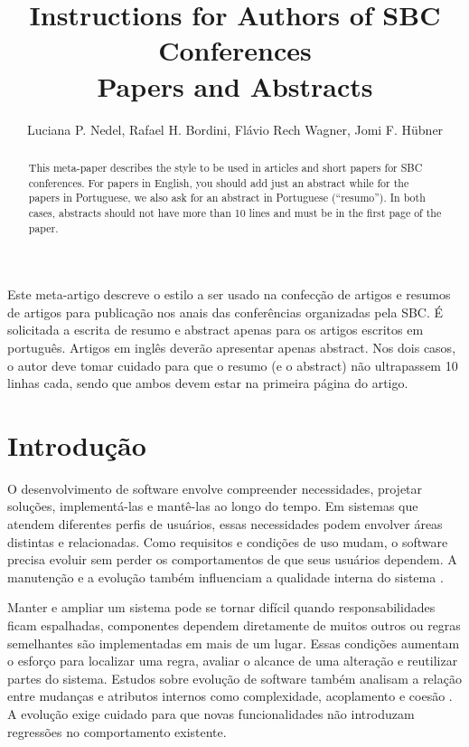 \documentclass[12pt]{article}
\title{Instructions for Authors of SBC Conferences\\ Papers and Abstracts}
\author{Luciana P. Nedel\inst{1}, Rafael H. Bordini\inst{2}, Flávio Rech
  Wagner\inst{1}, Jomi F. Hübner\inst{3} }
\begin{document}
 

\maketitle

\begin{abstract}
  This meta-paper describes the style to be used in articles and short papers
  for SBC conferences. For papers in English, you should add just an abstract
  while for the papers in Portuguese, we also ask for an abstract in
  Portuguese (``resumo''). In both cases, abstracts should not have more than
  10 lines and must be in the first page of the paper.
\end{abstract}
     
\begin{resumo} 
  Este meta-artigo descreve o estilo a ser usado na confecção de artigos e
  resumos de artigos para publicação nos anais das conferências organizadas
  pela SBC. É solicitada a escrita de resumo e abstract apenas para os artigos
  escritos em português. Artigos em inglês deverão apresentar apenas abstract.
  Nos dois casos, o autor deve tomar cuidado para que o resumo (e o abstract)
  não ultrapassem 10 linhas cada, sendo que ambos devem estar na primeira
  página do artigo.
\end{resumo}


\section{Introdução}

O desenvolvimento de software envolve compreender necessidades, projetar soluções, implementá-las e mantê-las ao longo do tempo. Em sistemas que atendem diferentes perfis de usuários, essas necessidades podem envolver áreas distintas e relacionadas. Como requisitos e condições de uso mudam, o software precisa evoluir sem perder os comportamentos de que seus usuários dependem. A manutenção e a evolução também influenciam a qualidade interna do sistema \cite{alenezi2021}.

Manter e ampliar um sistema pode se tornar difícil quando responsabilidades ficam espalhadas, componentes dependem diretamente de muitos outros ou regras semelhantes são implementadas em mais de um lugar. Essas condições aumentam o esforço para localizar uma regra, avaliar o alcance de uma alteração e reutilizar partes do sistema. Estudos sobre evolução de software também analisam a relação entre mudanças e atributos internos como complexidade, acoplamento e coesão \cite{alenezi2021}. A evolução exige cuidado para que novas funcionalidades não introduzam regressões no comportamento existente.
\end{document}
